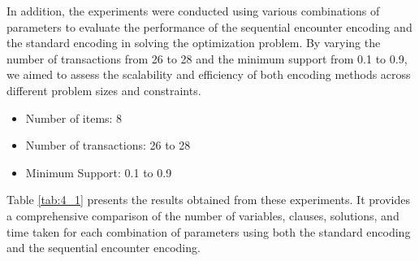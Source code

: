 In addition, the experiments were conducted using various combinations of parameters to evaluate the performance of the sequential encounter encoding and the standard encoding in solving the optimization problem. By varying the number of transactions from 26 to 28 and the minimum support from 0.1 to 0.9, we aimed to assess the scalability and efficiency of both encoding methods across different problem sizes and constraints.
\begin{itemize}
    \item Number of items: 8
    \item Number of transactions: 26 to 28
    \item Minimum Support: 0.1 to 0.9
\end{itemize}

Table \ref{tab:4_1} presents the results obtained from these experiments.
It provides a comprehensive comparison of the number of variables, clauses, solutions, and time taken for each combination of parameters using both the standard encoding and the sequential encounter encoding.
